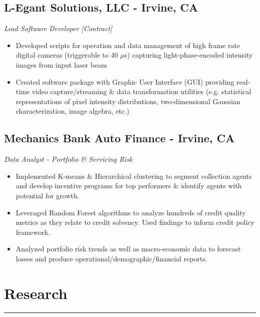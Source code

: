 \documentclass[11pt,a4paper]{article}
\newenvironment{myitemize}
{ \begin{itemize}[label={--}, leftmargin=*]
    \setlength{\itemsep}{0pt}
    \setlength{\parskip}{0pt}
    \setlength{\parsep}{0pt}     }
{ \end{itemize}                  }
\begin{document}
\subsection*{L-Egant Solutions, LLC - Irvine, CA \hfill {} }
\vspace{-1.5mm} %
\textit{Lead Software Developer [Contract]}
\vspace{-1.5mm} %
\begin{myitemize}
\item Developed scripts for operation and data management of high frame rate digital cameras (triggerable to 40 $\mu$s) capturing light-phase-encoded intensity images from input laser beam
\item Created software package with Graphic User Interface (GUI) providing real-time video capture/streaming \& data transformation utilities (e.g. statistical representations of pixel intensity distributions, two-dimensional Gaussian characterization, image algebra, etc.)
\end{myitemize}

\subsection*{Mechanics Bank Auto Finance - Irvine, CA \hfill {} }
\vspace{-1.5mm} %
\textit{Data Analyst - Portfolio \& Servicing Risk}
\vspace{-1.5mm} %
\begin{myitemize}
\item Implemented K-means \& Hierarchical clustering to segment collection agents and develop incentive programs for top performers \& identify agents with potential for growth.
\item Leveraged Random Forest algorithms to analyze hundreds of credit quality metrics as they relate to credit solvency. Used findings to inform credit policy framework.
\item Analyzed portfolio risk trends as well as macro-economic data to forecast losses and produce operational/demographic/financial reports.
\end{myitemize}


\section*{Research}
\vspace{-3mm} %
\hrule
\vspace{3mm} %
\end{document}
